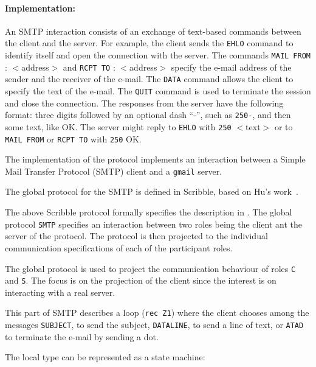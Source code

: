 
\paragraph{Implementation:}
An SMTP interaction consists of an exchange of text-based {commands}
between the client and the server.
For example, the client sends the
\lstinline|EHLO| command to identify itself and open the connection with
the server.
%
The commands \lstinline|MAIL FROM| : $<$address$>$ and \lstinline|RCPT TO| : $<$address$>$
specify the e-mail address of the sender and the
receiver of the e-mail.
%
The \lstinline|DATA| command allows the client to specify the text of
the e-mail. The \lstinline|QUIT| command is used to terminate the
session and close the connection. The responses from the server have the
following format: three digits followed by an optional dash ``-'', such
as \lstinline|250-|, and then some text, like OK. The server might reply
to \lstinline|EHLO| with \lstinline|250| $<$text$>$ or to
\lstinline|MAIL FROM| or \lstinline|RCPT TO| with \lstinline|250| OK.


The implementation of the protocol implements an interaction between
a Simple Mail Transfer Protocol (SMTP) client and a \lstinline|gmail| server.


The global protocol for the SMTP is defined in Scribble,
based on Hu's work~\cite{HuR:smtp}.



The above Scribble protocol formally specifies
the description in .
The global protocol \lstinline|SMTP| specifies
an interaction between two roles being the client ant the server of the protocol.
The protocol is then projected to the
individual communication specifications of each
of the participant roles.

The global protocol is used to project the communication
behaviour of roles \lstinline|C| and \lstinline|S|.
The focus is on the projection of the client
since the interest is on interacting with a real server.

This part of SMTP describes a loop (\lstinline|rec Z1|) where the client chooses
among the messages \lstinline|SUBJECT|, to send the subject,
\lstinline|DATALINE|, to send a line of text, or \lstinline|ATAD| to terminate the e-mail by sending a dot.



The local type can be represented as a state
machine:


